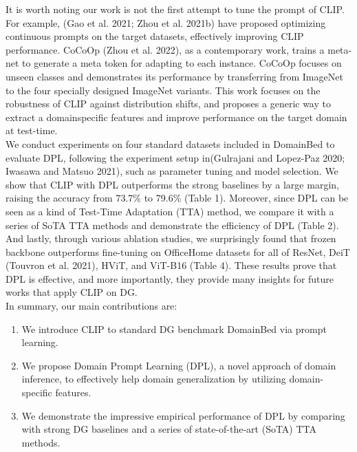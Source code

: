 \documentclass[11pt,twocolumn]{article}
\begin{document}
\hspace{1cm}
It is worth noting our work is not the first attempt to tune the prompt of CLIP. For example, (Gao et al. 2021; Zhou et al. 2021b) have proposed optimizing continuous prompts on the target datasets, effectively improving CLIP performance. CoCoOp (Zhou et al. 2022), as a contemporary work, trains a meta-net to generate a meta token for adapting to each instance. CoCoOp focuses on unseen classes and demonstrates its performance by transferring from ImageNet to the four specially designed ImageNet variants. This work focuses on the robustness of CLIP against distribution shifts, and proposes a generic way to extract a domainspecific features and improve performance on the target domain at test-time.\\
\hspace{1cm}
We conduct experiments on four standard datasets included in DomainBed to evaluate DPL, following the experiment setup in(Gulrajani and Lopez-Paz 2020; Iwasawa and Matsuo 2021), such as parameter tuning and model selection. We show that CLIP with DPL outperforms the strong baselines by a large margin, raising the accuracy from 73.7\% to 79.6\% (Table 1). Moreover, since DPL can be seen as a kind of Test-Time Adaptation (TTA) method, we compare it with a series of SoTA TTA methods and demonstrate the efficiency of DPL (Table 2). And lastly, through various ablation studies, we surprisingly found that frozen backbone outperforms fine-tuning on OfficeHome datasets for all of ResNet, DeiT (Touvron et al. 2021), HViT, and ViT-B16 (Table 4). These results prove that DPL is effective, and more importantly, they provide many insights for future works that apply CLIP on DG.\\
\hspace{1cm}
In summary, our main contributions are:\\
\begin{enumerate}
    \item We introduce CLIP to standard DG benchmark DomainBed via prompt learning.\\
    \item We propose Domain Prompt Learning (DPL), a novel approach of domain inference, to effectively help domain
generalization by utilizing domain-specific features.\\
\item We demonstrate the impressive empirical performance of
DPL by comparing with strong DG baselines and a series
of state-of-the-art (SoTA) TTA methods.\\
\end{enumerate}
\end{document}
